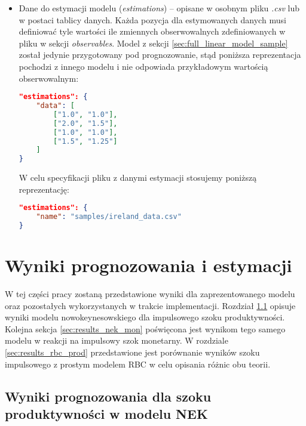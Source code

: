 \begin{itemize}
\begin{itemize}
    \end{itemize}
    \item Dane do estymacji modelu (\emph{estimations}) -- opisane w osobnym pliku \emph{.csv} lub w postaci tablicy danych. Każda pozycja dla estymowanych danych musi definiować tyle wartości ile zmiennych obserwowalnych zdefiniowanych w pliku w sekcji \emph{observables}. Model z sekcji \ref{sec:full_linear_model_sample} został jedynie przygotowany pod prognozowanie, stąd poniższa reprezentacja pochodzi z innego modelu i nie odpowiada przykładowym wartością obserwowalnym:
    \begin{lstlisting}[language=json,firstnumber=1]
"estimations": {
    "data": [
        ["1.0", "1.0"],
        ["2.0", "1.5"],
        ["1.0", "1.0"],
        ["1.5", "1.25"]
    ]
}
    \end{lstlisting}
    W celu specyfikacji pliku z danymi estymacji stosujemy poniższą reprezentację:
    \begin{lstlisting}[language=json,firstnumber=1]
"estimations": {
    "name": "samples/ireland_data.csv"
}
    \end{lstlisting}
\end{itemize}

\section{Wyniki prognozowania i estymacji}

W tej części pracy zostaną przedstawione wyniki dla zaprezentowanego modelu oraz pozostałych wykorzystanych w trakcie implementacji. Rozdział \ref{sec:results_nek_prod} opisuje wyniki modelu nowokeynesowskiego dla impulsowego szoku produktywności. Kolejna sekcja \ref{sec:results_nek_mon} poświęcona jest wynikom tego samego modelu w reakcji na impulsowy szok monetarny. W rozdziale \ref{sec:results_rbc_prod} przedstawione jest porównanie wyników szoku impulsowego z prostym modelem RBC w celu opisania różnic obu teorii. 

\subsection{Wyniki prognozowania dla szoku produktywności w modelu NEK}
\label{sec:results_nek_prod}

